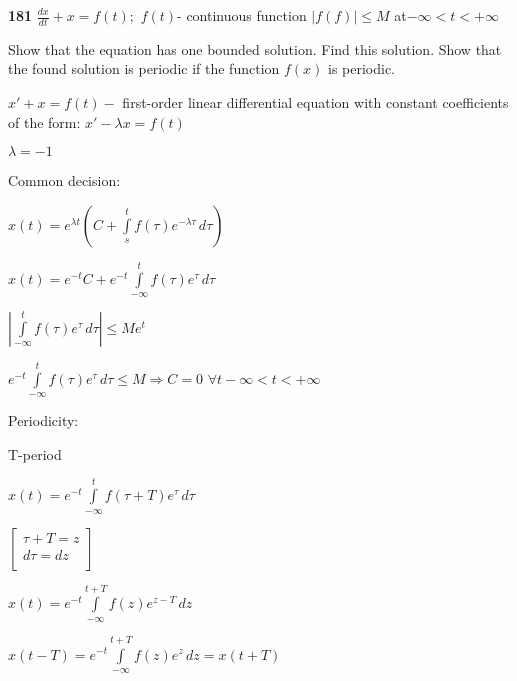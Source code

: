 \documentclass{article}
\begin{document}
\begin{flushleft}
{\bf 181 } $\displaystyle \frac{dx}{dt}+x=f(t); $ $f(t)$- continuous function $|f(f)|\leq M$ at$ -\infty<t<+\infty$

\end{flushleft}
Show that the equation has one bounded solution. Find this solution. Show that the found solution is periodic if the function $f(x)$ is periodic.
\begin{center}
\begin{spacing}{2}
$x'+x=f(t)-$ first-order linear differential equation with constant coefficients of the form: $x'-\lambda x=f(t)$

$\lambda=-1$
\end{spacing}
\end{center}
Common decision:
\begin{center}
\begin{spacing}{2}
$\displaystyle x(t)=e^{\lambda t}(C+\int\limits _s^t f(\tau)e^{-\lambda\tau}\,d\tau)$

$\displaystyle x(t)=e^{-t}C+e^{-t}\int\limits _{-\infty}^t f(\tau)e^{\tau}\,d\tau$

$\displaystyle |\int\limits _{-\infty}^t f(\tau)e^{\tau}\,d\tau| \leq Me^t$ 

$\displaystyle e^{-t}\int\limits _{-\infty}^t f(\tau)e^{\tau}\,d\tau \leq M \Rightarrow C=0$ $ \forall t -\infty<t<+\infty$ 

\end{spacing}
\end{center}
\begin{flushleft}
Periodicity:

T-period
\end{flushleft}
\begin{center}
\begin{spacing}{1}
$\displaystyle x(t)=e^{-t}\int\limits _{-\infty}^t f(\tau+T)e^{\tau}\,d\tau$
\end{spacing}
\end{center}
\begin{center}
\begin{spacing}{1.5}
$\left[
  \begin{array}{ccc}
     \tau + T = z \\
     d\tau = dz \\
  \end{array}
\right]$
\end{spacing}
\end{center}

\begin{center}
\begin{spacing}{3}
$\displaystyle x(t)=e^{-t}\int\limits _{-\infty}^{t+T} f(z)e^{z-T}\,dz$

$\displaystyle x(t-T)=e^{-t}\int\limits _{-\infty}^{t+T} f(z)e^{z}\,dz = x(t+T)$
\end{spacing}
\end{center}
\end{document}
